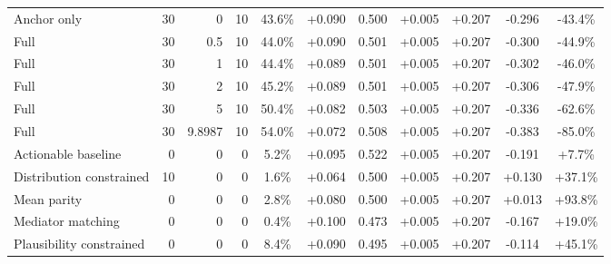 \begin{table}[htbp]
\begin{tabular}{lrrrccccccc}
Anchor only & 30 & 0 & 10 & 43.6\% & +0.090 & 0.500 & +0.005 & +0.207 & -0.296 & -43.4\% \\
Full & 30 & 0.5 & 10 & 44.0\% & +0.090 & 0.501 & +0.005 & +0.207 & -0.300 & -44.9\% \\
Full & 30 & 1 & 10 & 44.4\% & +0.089 & 0.501 & +0.005 & +0.207 & -0.302 & -46.0\% \\
Full & 30 & 2 & 10 & 45.2\% & +0.089 & 0.501 & +0.005 & +0.207 & -0.306 & -47.9\% \\
Full & 30 & 5 & 10 & 50.4\% & +0.082 & 0.503 & +0.005 & +0.207 & -0.336 & -62.6\% \\
Full & 30 & 9.8987 & 10 & 54.0\% & +0.072 & 0.508 & +0.005 & +0.207 & -0.383 & -85.0\% \\
Actionable baseline & 0 & 0 & 0 & 5.2\% & +0.095 & 0.522 & +0.005 & +0.207 & -0.191 & +7.7\% \\
Distribution constrained & 10 & 0 & 0 & 1.6\% & +0.064 & 0.500 & +0.005 & +0.207 & +0.130 & +37.1\% \\
Mean parity & 0 & 0 & 0 & 2.8\% & +0.080 & 0.500 & +0.005 & +0.207 & +0.013 & +93.8\% \\
Mediator matching & 0 & 0 & 0 & 0.4\% & +0.100 & 0.473 & +0.005 & +0.207 & -0.167 & +19.0\% \\
Plausibility constrained & 0 & 0 & 0 & 8.4\% & +0.090 & 0.495 & +0.005 & +0.207 & -0.114 & +45.1\% \\
\bottomrule
\end{tabular}
\end{table}